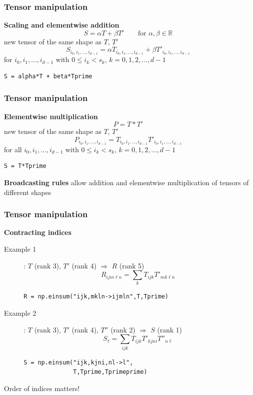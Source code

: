 \documentclass{beamer}
\begin{document}

\begin{frame}[fragile]
  \frametitle{Tensor manipulation}
  \textbf{Scaling and elementwise addition}
$$
S=\alpha T+\beta T'\qquad\text{for $\alpha,\beta\in \mathbb{R}$}
$$
new tensor of the same shape as $T$, $T'$
$$
S_{i_0,i_1,\dots,i_{d-1}} = \alpha T_{i_0,i_1,\dots,i_{d-1}}+\beta T'_{i_0,i_1,\dots,i_{d-1}}
$$
for $i_0,i_1,\dots,i_{d-1}$ with $0\le i_k < s_k$, $k=0,1,2,\dots,d-1$

\begin{lstlisting}
S = alpha*T + beta*Tprime
\end{lstlisting}
\end{frame}


\begin{frame}[fragile]
  \frametitle{Tensor manipulation}
\textbf{Elementwise multiplication}
$$
P=T*T'
$$ new tensor of the same shape as $T$, $T'$
$$
P_{i_0,i_1,\dots,i_{d-1}} = T_{i_0,i_1,\dots,i_{d-1}}T'_{i_0,i_1,\dots,i_{d-1}}
$$
for all $i_0,i_1,\dots,i_{d-1}$ with $0\le i_k < s_k$, $k=0,1,2,\dots,d-1$
\begin{lstlisting}
S = T*Tprime
\end{lstlisting}
\textbf{Broadcasting rules} allow addition and elementwise multiplication of tensors of different shapes
\end{frame}


\begin{frame}[fragile]
  \frametitle{Tensor manipulation}
  \textbf{Contracting indices}
  \begin{description}
\item[Example 1]: $T$ (rank 3), $T'$ (rank 4) $\Rightarrow$ $R$  (rank 5) 
$$
R_{ijm\ell n} = \sum_{k} T_{ijk} T'_{mk\ell n}
$$
\begin{lstlisting}
R = np.einsum("ijk,mkln->ijmln",T,Tprime)
\end{lstlisting}
\item[Example 2]: $T$ (rank 3), $T'$ (rank 4), $T''$ (rank 2) $\Rightarrow$ $S$  (rank 1) 
$$
S_{\ell} = \sum_{ijk} T_{ijk} T'_{kjni} T''_{n\ell}
$$
\begin{lstlisting}
S = np.einsum("ijk,kjni,nl->l",
              T,Tprime,Tprimeprime)
\end{lstlisting}
\end{description}
Order of indices matters!
\end{frame}
\end{document}
